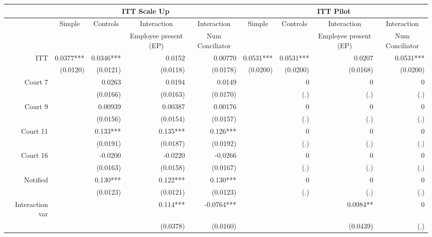 \begin{tabular}{rrrrrrrrr}
\toprule
      & \multicolumn{4}{c}{ITT Scale Up} & \multicolumn{4}{c}{ITT Pilot} \\
\midrule
      & \multicolumn{1}{c}{Simple} & \multicolumn{1}{c}{Controls} & \multicolumn{1}{c}{Interaction} & \multicolumn{1}{c}{Interaction} & \multicolumn{1}{c}{Simple} & \multicolumn{1}{c}{Controls} & \multicolumn{1}{c}{Interaction} & \multicolumn{1}{c}{Interaction} \\
      \midrule
      & \multicolumn{1}{c}{} & \multicolumn{1}{c}{} & \multicolumn{1}{c}{Employee present (EP)} & \multicolumn{1}{c}{Num Conciliator} & \multicolumn{1}{c}{} & \multicolumn{1}{c}{} & \multicolumn{1}{c}{Employee present (EP)} & \multicolumn{1}{c}{Num Conciliator} \\
      \midrule
      \midrule
ITT   & 0.0377*** & 0.0346*** & 0.0152 & 0.00770 & 0.0531*** & 0.0531*** & 0.0207 & 0.0531*** \\
      & (0.0120) & (0.0121) & (0.0118) & (0.0178) & (0.0200) & (0.0200) & (0.0168) & (0.0200) \\
Court 7 &       & 0.0263 & 0.0194 & 0.0149 &       & 0     & 0     & 0 \\
      &       & (0.0166) & (0.0163) & (0.0170) &       & (.)   & (.)   & (.) \\
Court 9 &       & 0.00939 & 0.00387 & 0.00176 &       & 0     & 0     & 0 \\
      &       & (0.0156) & (0.0154) & (0.0157) &       & (.)   & (.)   & (.) \\
Court 11 &       & 0.133*** & 0.135*** & 0.126*** &       & 0     & 0     & 0 \\
      &       & (0.0191) & (0.0187) & (0.0192) &       & (.)   & (.)   & (.) \\
Court 16 &       & -0.0200 & -0.0220 & -0.0266 &       & 0     & 0     & 0 \\
      &       & (0.0163) & (0.0158) & (0.0167) &       & (.)   & (.)   & (.) \\
Notified &       & 0.130*** & 0.122*** & 0.130*** &       & 0     & 0     & 0 \\
      &       & (0.0123) & (0.0121) & (0.0123) &       & (.)   & (.)   & (.) \\
Interaction var &       &       & 0.114*** & -0.0764*** &       &       & 0.0984** & 0 \\
      &       &       & (0.0378) & (0.0160) &       &       & (0.0439) & (.) \\

\end{tabular}
